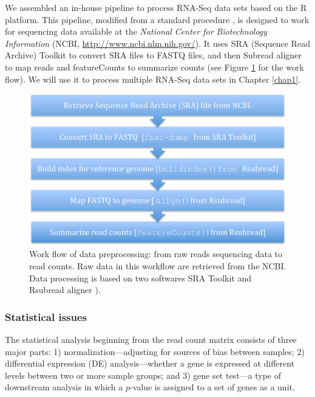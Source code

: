 We assembled an in-house pipeline to process RNA-Seq data sets based on the R \citep{Rpackage} platform.
 This pipeline, modified from a standard procedure \citep{anders2013count},   is designed to work for sequencing data available at the \textit{National Center for Biotechnology Information} (NCBI, \url{http://www.ncbi.nlm.nih.gov/}). It uses SRA (Sequence Read Archive) Toolkit \citep{leinonen2010sequence} to convert SRA files to FASTQ files,  and then Subread aligner \citep{liao2013subread} to map reads and featureCounts \citep{liao2013featurecounts} to summarize counts (see Figure \ref{fig:flowchart} for the work flow). We will use it to process multiple RNA-Seq data sets in Chapter \ref{chap1}.
\begin{figure}[!ht]
	\centering
	\includegraphics[width=0.7\linewidth]{Figures/flowchart.pdf}
	\caption{Work flow of data preprocessing: from raw reads sequencing data to read counts. Raw data
		in this workflow are retrieved from the NCBI. Data processing is based on two softwares SRA Toolkit
		\citep{leinonen2010sequence} 
		and Rsubread aligner \citep{liao2013subread}).}
	\label{fig:flowchart}
\end{figure}	



\subsubsection{Statistical issues}
The statistical analysis beginning from the read count matrix consists of three major parts: 1)
normalization---adjusting for sources of bias between samples; 2) differential expression (DE)
analysis---whether a gene is expressed at different levels between two or more sample groups; and 3)
gene set test---a type of downstream analysis in which a $p$-value is assigned to a set of genes as
a unit.

